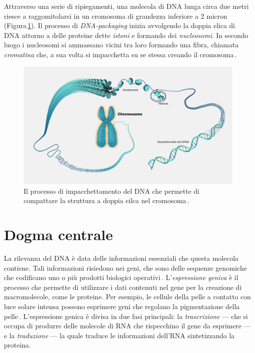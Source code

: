 Attraverso una serie di ripiegamenti, una molecola di \acs{DNA} lunga circa due metri riesce a raggomitolarsi in un cromosoma di grandezza inferiore a 2 micron (Figura\,\ref{fig:dna-packaging}). Il processo di \textit{\acs{DNA}-packaging} inizia avvolgendo la doppia elica di \acs{DNA} attorno a delle proteine dette \textsl{istoni} e formando dei \textsl{nucleosomi}. In secondo luogo i nucleosomi si ammassano vicini tra loro formando una fibra, chiamata \textsl{cromatina} che, a sua volta si impacchetta su se stessa creando il cromosoma\,\cite{jansen2011nucleosome, zheng2010packaging}.

\begin{figure}[b!]
    \centering
    \includegraphics[width=\textwidth]{assets/imgs/dna-packaging.jpg}
    \caption[Il processo di impacchettamento del \acs{DNA}.]{Il processo di impacchettamento del \acs{DNA} che permette di compattare la struttura a doppia eilca nel cromosoma\,\cite{nhgri_chromosome_image}.}\label{fig:dna-packaging}
\end{figure}

\section{Dogma centrale}

La rilevanza del \acs{DNA} è data delle informazioni essenziali che questa molecola contiene. Tali informazioni risiedono nei geni, che sono delle sequenze genomiche che codificano uno o più prodotti biologici operativi\,\cite{gerstein2007gene}. L'\textsl{espressione genica} è il processo che permette di utilizzare i dati contenuti nel gene per la creazione di macromolecole, come le proteine. Per esempio, le cellule della pelle a contatto con luce solare intensa possono esprimere geni che regolano la pigmentazione della pelle\,\cite{white2009gene}. L'espressione genica è divisa in due fasi principali: la \textsl{trascrizione} — che si occupa di produrre delle molecole di \acs{RNA} che rispecchino il gene da esprimere — e la \textsl{traduzione} — la quale traduce le informazioni dell'\acs{RNA} sintetizzando la proteina.


